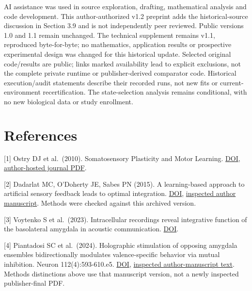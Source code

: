 \documentclass[
  american,
  11pt,
  letterpaper,
]{article}
\begin{document}
\par

\ifdim\dimexpr\pagegoal-\pagetotal\relax<70pt\newpage\fi AI assistance was used in source exploration, drafting, mathematical analysis and code development. This author-authorized v1.2 preprint adds the historical-source discussion in Section 3.9 and is not independently peer reviewed. Public versions 1.0 and 1.1 remain unchanged. The technical supplement remains v1.1, reproduced byte-for-byte; no mathematics, application results or prospective experimental design was changed for this historical update. Selected original code/results are public; links marked availability lead to explicit exclusions, not the complete private runtime or publisher-derived comparator code. Historical execution/audit statements describe their recorded runs, not new fits or current-environment recertification. The state-selection analysis remains conditional, with no new biological data or study enrollment.

\begingroup\small\setlength{\parskip}{3pt}

\section{References}\label{references}

{[}1{]} Ostry DJ et al.~(2010). Somatosensory Plasticity and Motor Learning. \href{https://doi.org/10.1523/JNEUROSCI.4571-09.2010}{DOI}, \href{https://gribblelab.org/assets/files/papers/2010_JNeurosci_ODMWG.pdf}{author-hosted journal PDF}.

{[}2{]} Dadarlat MC, O'Doherty JE, Sabes PN (2015). A learning-based approach to artificial sensory feedback leads to optimal integration. \href{https://doi.org/10.1038/nn.3883}{DOI}, \href{https://pmc.ncbi.nlm.nih.gov/articles/PMC4282864/}{inspected author manuscript}. Methods were checked against this archived version.

{[}3{]} Voytenko S et al.~(2023). Intracellular recordings reveal integrative function of the basolateral amygdala in acoustic communication. \href{https://doi.org/10.1152/jn.00103.2023}{DOI}.

{[}4{]} Piantadosi SC et al.~(2024). Holographic stimulation of opposing amygdala ensembles bidirectionally modulates valence-specific behavior via mutual inhibition. Neuron 112(4):593-610.e5. \href{https://doi.org/10.1016/j.neuron.2023.11.007}{DOI}, \href{https://pmc.ncbi.nlm.nih.gov/articles/PMC10984369/}{inspected author-manuscript text}. Methods distinctions above use that manuscript version, not a newly inspected publisher-final PDF.
\end{document}
